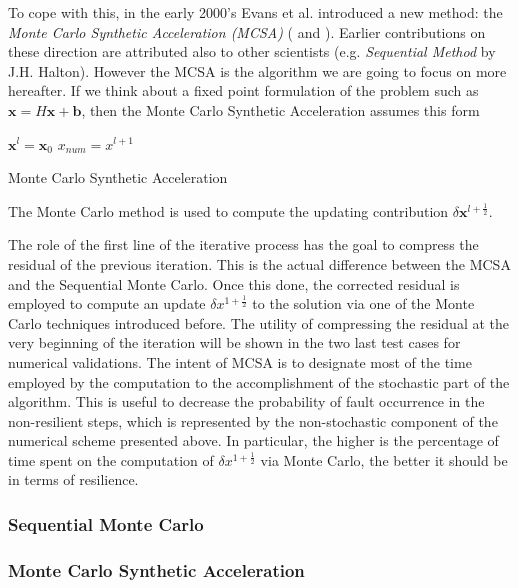To cope with this, in the early 2000's Evans et al. introduced a new method:
the
\textit{Monte Carlo Synthetic Acceleration (MCSA)}
(\cite{ESW2013} and \cite{EMSH2014}). Earlier contributions on these direction
are attributed also to other scientists (e.g. \textit{Sequential Method} by
J.H. Halton). However the MCSA is the algorithm we are going to focus on more
hereafter. If
we think about a fixed point formulation of the problem
such as $\mathbf{x}=H\mathbf{x}+\mathbf{b}$, then the Monte Carlo Synthetic
Acceleration assumes this form

\begin{algorithm}[H]
 $\mathbf{x}^{l}=\mathbf{x}_0$\;
 $x_{num}=x^{l+1}$\;
 \caption{Monte Carlo Synthetic Acceleration}
\end{algorithm}
The Monte Carlo method is used to compute the updating contribution $\delta
\mathbf{x}^{l+\frac{1}{2}}$.

The role of the first line of the iterative process has the goal to compress
the residual of the previous iteration. This is the actual difference
between the MCSA and the Sequential Monte Carlo. Once this done, the corrected
residual
is employed to compute an update $\delta x^{1+\frac{1}{2}}$ to the solution via
one of the Monte Carlo techniques introduced before. The utility of compressing
the residual at the very beginning of the iteration will be shown in the two
last test cases for numerical validations.
The intent of MCSA is to designate most of the time employed by the
computation to the accomplishment of the stochastic part of the algorithm.
This
is useful to decrease the probability of fault occurrence in the non-resilient
steps, which is represented by the non-stochastic component of the numerical
scheme presented above. In particular, the higher is the percentage of time
spent on the computation of $\delta x^{1+\frac{1}{2}}$ via Monte Carlo, the
better it should be in terms of resilience.

\subsubsection{Sequential Monte Carlo}

\subsubsection{Monte Carlo Synthetic Acceleration}

